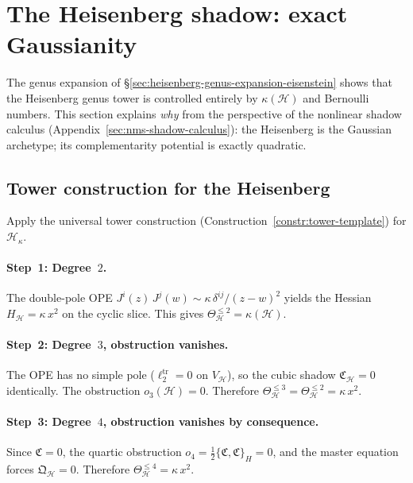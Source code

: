 \section{The Heisenberg shadow: exact Gaussianity}
\label{sec:heisenberg-shadow-gaussianity}

The genus expansion of \S\ref{sec:heisenberg-genus-expansion-eisenstein}
shows that the Heisenberg genus tower is controlled entirely by
$\kappa(\mathcal{H})$ and Bernoulli numbers. This section explains
\emph{why} from the perspective of the nonlinear shadow calculus
(Appendix~\ref{sec:nms-shadow-calculus}): the Heisenberg is the
Gaussian archetype; its complementarity potential is exactly
quadratic.

\subsection{Tower construction for the Heisenberg}
\label{subsec:heisenberg-tower-construction}

Apply the universal tower construction
(Construction~\ref{constr:tower-template}) for
$\mathcal{H}_\kappa$.

\paragraph{Step~1: Degree~$2$.}
The double-pole OPE $J^i(z)\,J^j(w) \sim \kappa\,\delta^{ij}/(z-w)^2$
yields the Hessian $H_{\mathcal{H}} = \kappa\,x^2$ on
the cyclic slice. This gives
$\Theta_{\mathcal{H}}^{\leq 2} = \kappa(\mathcal{H})$.

\paragraph{Step~2: Degree~$3$, obstruction vanishes.}
The OPE has no simple pole ($\ell_2^{\mathrm{tr}} = 0$ on
$V_{\mathcal{H}}$), so the cubic shadow
$\mathfrak{C}_{\mathcal{H}} = 0$ identically.
The obstruction $o_3(\mathcal{H}) = 0$.
Therefore $\Theta_{\mathcal{H}}^{\leq 3}
= \Theta_{\mathcal{H}}^{\leq 2} = \kappa\,x^2$.

\paragraph{Step~3: Degree~$4$, obstruction vanishes by consequence.}
Since $\mathfrak{C} = 0$, the quartic obstruction
$o_4 = \tfrac12\{\mathfrak{C},\mathfrak{C}\}_H = 0$,
and the master equation forces $\mathfrak{Q}_{\mathcal{H}} = 0$.
Therefore $\Theta_{\mathcal{H}}^{\leq 4} = \kappa\,x^2$.


